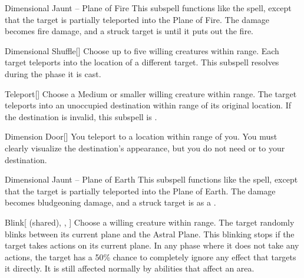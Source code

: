 \begin{ability}[\nth{2}]{Dimensional Jaunt -- Plane of Fire}
This subspell functions like the  spell, except that the target is partially teleported into the Plane of Fire.
The damage becomes fire damage, and a struck target is  until it puts out the fire.
\end{ability}
\vspace{0.25em}


\begin{ability}[\nth{2}]{Dimensional Shuffle}[]
Choose up to five willing creatures within \rngmed range.
Each target teleports into the location of a different target.
This subspell resolves during the phase it is cast.
\end{ability}
\vspace{0.25em}


\begin{ability}[\nth{2}]{Teleport}[]
Choose a Medium or smaller willing creature within \rngclose range.
The target teleports into an unoccupied destination within \rngmed range of its original location.
If the destination is invalid, this subspell is .
\end{ability}
\vspace{0.25em}


\begin{ability}[\nth{4}]{Dimension Door}[]
You teleport to a location within \rngext range of you.
You must clearly visualize the destination's appearance, but you do not need  or  to your destination.
\end{ability}
\vspace{0.25em}


\begin{ability}[\nth{4}]{Dimensional Jaunt -- Plane of Earth}
This subspell functions like the  spell, except that the target is partially teleported into the Plane of Earth.
The damage becomes bludgeoning damage, and a struck target is  as a .
\end{ability}
\vspace{0.25em}


\begin{ability}[\nth{5}]{Blink}[ (shared), , ]
Choose a willing creature within \rngclose range.
The target randomly blinks between its current plane and the Astral Plane.
This blinking stops if the target takes actions on its current plane.
In any phase where it does not take any actions, the target has a 50\% chance to completely ignore any effect that targets it directly.
It is still affected normally by abilities that affect an area.
\end{ability}
\vspace{0.25em}


